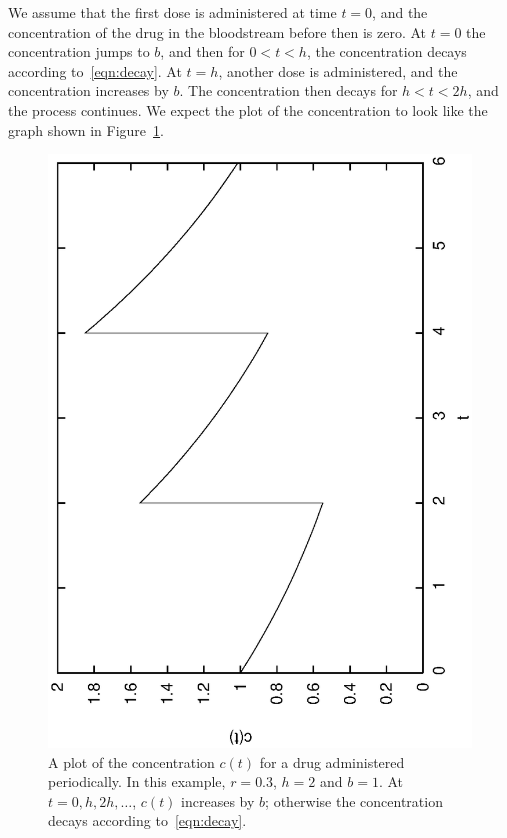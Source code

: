 \documentclass[reqno]{immbook}
\numberwithin{equation}{chapter}
\numberwithin{question}{section}
\numberwithin{theorem}{chapter}
\numberwithin{figure}{chapter}
\theoremstyle{definition}
\begin{document}
We assume that the first dose is administered at time $t=0$, and
the concentration of the drug in the bloodstream before then
is zero.  At $t=0$ the concentration jumps to $b$, and then
for $0 < t < h$, the concentration decays according
to~\eqref{eqn:decay}.  At $t=h$, another dose is administered,
and the concentration increases by $b$. The concentration then decays
for $h < t < 2h$, and the process continues.
We expect the plot of the concentration to look like
the graph shown in Figure~\ref{fig:PeriodicDrugDosePlot}.
\begin{figure}
\centerline{%
\includegraphics[angle=270,width=4.5in]{python_PeriodicDrugDose/PeriodicDrugDosePlot.eps}
}
\caption{A plot of the concentration $c(t)$ for a drug administered
periodically.  In this example, $r=0.3$, $h=2$ and $b=1$.
At $t=0, h, 2h, \ldots$, $c(t)$ increases by $b$; otherwise
the concentration decays according to~\eqref{eqn:decay}.}
\label{fig:PeriodicDrugDosePlot}
\end{figure}
\end{document}
